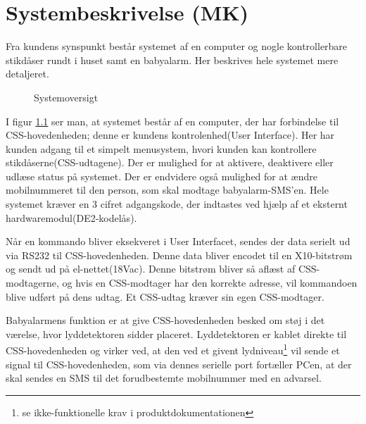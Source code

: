 \chapter{Systembeskrivelse (MK)}

Fra kundens synspunkt består systemet af en computer og nogle kontrollerbare stikdåser rundt i huset samt en babyalarm. Her beskrives hele systemet mere detaljeret.

\begin{figure}[H] \centering
{}
\caption{Systemoversigt}
\label{fig:sys_oversigt}
\end{figure}

I figur \ref{fig:sys_oversigt} ser man, at systemet består af en computer, der har forbindelse til CSS-hovedenheden; denne er kundens kontrolenhed(User Interface). Her har kunden adgang til et simpelt menusystem, hvori kunden kan kontrollere stikdåserne(CSS-udtagene). Der er mulighed for at aktivere, deaktivere eller udlæse status på systemet. Der er endvidere også mulighed for at ændre mobilnummeret til den person, som skal modtage babyalarm-SMS'en. Hele systemet kræver en 3 cifret adgangskode, der indtastes ved hjælp af et eksternt hardwaremodul(DE2-kodelås).

Når en kommando bliver eksekveret i User Interfacet, sendes der data serielt ud via RS232 til CSS-hovedenheden. Denne data bliver encodet til en X10-bitstrøm og sendt ud på el-nettet(18Vac). Denne bitstrøm bliver så aflæst af CSS-modtagerne, og hvis en CSS-modtager har den korrekte adresse, vil kommandoen blive udført på dens udtag. Et CSS-udtag kræver sin egen CSS-modtager.

Babyalarmens funktion er at give CSS-hovedenheden besked om støj i det værelse, hvor lyddetektoren sidder placeret. Lyddetektoren er kablet direkte til CSS-hovedenheden og virker ved, at den ved et givent lydniveau\footnote{se ikke-funktionelle krav i produktdokumentationen} vil sende et signal til CSS-hovedenheden, som via dennes serielle port fortæller PCen, at der skal sendes en SMS til det forudbestemte mobilnummer med en advarsel.

